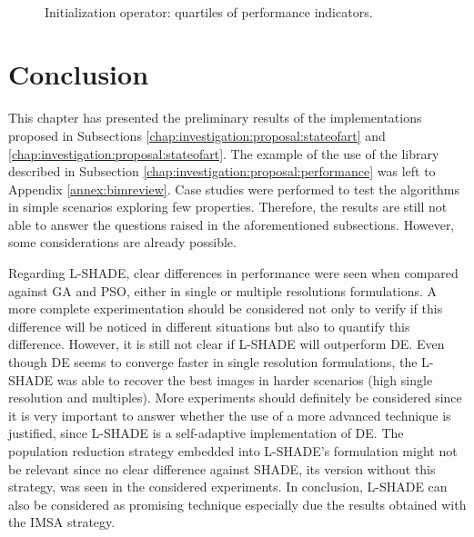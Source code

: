 			\begin{figure}
				\centering
				 \\
				\caption[Initialization operator: indicators.]{Initialization operator: quartiles of performance indicators.}
				\label{fig:results:ca:res:indicators}
			\end{figure}
		
	\section{Conclusion}\label{chap:results:conclusion}
	
		This chapter has presented the preliminary results of the implementations proposed in Subsections \ref{chap:investigation:proposal:stateofart} and \ref{chap:investigation:proposal:stateofart}. The example of the use of the library described in Subsection \ref{chap:investigation:proposal:performance} was left to Appendix \ref{annex:bimreview}. Case studies were performed to test the algorithms in simple scenarios exploring few properties. Therefore, the results are still not able to answer the questions raised in the aforementioned subsections. However, some considerations are already possible.
		
		Regarding L-SHADE, clear differences in performance were seen when compared against GA and PSO, either in single or multiple resolutions formulations. A more complete experimentation should be considered not only to verify if this difference will be noticed in different situations but also to quantify this difference. However, it is still not clear if L-SHADE will outperform DE. Even though DE seems to converge faster in single resolution formulations, the L-SHADE was able to recover the best images in harder scenarios (high single resolution and multiples). More experiments should definitely be considered since it is very important to answer whether the use of a more advanced technique is justified, since L-SHADE is a self-adaptive implementation of DE. The population reduction strategy embedded into L-SHADE's formulation might not be relevant since no clear difference against SHADE, its version without this strategy, was seen in the considered experiments. In conclusion, L-SHADE can also be considered as promising technique especially due the results obtained with the IMSA strategy.  
		
